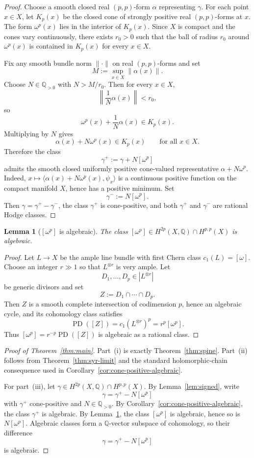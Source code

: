 \documentclass[11pt]{article}
\numberwithin{equation}{section}
\theoremstyle{plain}
\newtheorem{lemma}[theorem]{Lemma}
\theoremstyle{definition}
\theoremstyle{remark}
\DeclareMathOperator{\PD}{PD}
\newcommand{\Q}{\mathbb{Q}}
\begin{document}
\begin{proof}
Choose a smooth closed real $(p,p)$-form $\alpha$ representing $\gamma$. For each point $x\in X$, let $K_p(x)$ be the closed cone of strongly positive real $(p,p)$-forms at $x$. The form $\omega^p(x)$ lies in the interior of $K_p(x)$. Since $X$ is compact and the cones vary continuously, there exists $r_0>0$ such that the ball of radius $r_0$ around $\omega^p(x)$ is contained in $K_p(x)$ for every $x\in X$.

Fix any smooth bundle norm $\|\cdot\|$ on real $(p,p)$-forms and set
\[
M:=\sup_{x\in X}\|\alpha(x)\|.
\]
Choose $N\in\Q_{>0}$ with $N>M/r_0$. Then for every $x\in X$,
\[
\left\|\frac{1}{N}\alpha(x)\right\|<r_0,
\]
so
\[
\omega^p(x)+\frac{1}{N}\alpha(x)\in K_p(x).
\]
Multiplying by $N$ gives
\[
\alpha(x)+N\omega^p(x)\in K_p(x)
\qquad\text{for all }x\in X.
\]
Therefore the class
\[
\gamma^+:=\gamma+N[\omega^p]
\]
admits the smooth closed uniformly positive cone-valued representative $\alpha+N\omega^p$.  Indeed, $x\mapsto\langle \alpha(x)+N\omega^p(x),\psi_x\rangle$ is a continuous positive function on the compact manifold $X$, hence has a positive minimum.  Set
\[
\gamma^-:=N[\omega^p].
\]
Then $\gamma=\gamma^+-\gamma^-$, the class $\gamma^+$ is cone-positive, and both $\gamma^+$ and $\gamma^-$ are rational Hodge classes.
\end{proof}

\begin{lemma}[{$[\omega^p]$ is algebraic}]\label{lem:omega-alg}
The class $[\omega^p]\in H^{2p}(X,\Q)\cap H^{p,p}(X)$ is algebraic.
\end{lemma}

\begin{proof}
Let $L\to X$ be the ample line bundle with first Chern class $c_1(L)=[\omega]$. Choose an integer $r\gg 1$ so that $L^{\otimes r}$ is very ample. Let
\[
D_1,\dots,D_p\in |L^{\otimes r}|
\]
be generic divisors and set
\[
Z:=D_1\cap\cdots\cap D_p.
\]
Then $Z$ is a smooth complete intersection of codimension $p$, hence an algebraic cycle, and its cohomology class satisfies
\[
\PD([Z])=c_1(L^{\otimes r})^p=r^p[\omega^p].
\]
Thus $[\omega^p]=r^{-p}\PD([Z])$ is algebraic as a rational class.
\end{proof}

\begin{proof}[Proof of Theorem~\ref{thm:main}]
Part~\textnormal{(i)} is exactly Theorem~\ref{thm:spine}. Part~\textnormal{(ii)} follows from Theorem~\ref{thm:syr-limit} and the standard holomorphic-chain consequence used in Corollary~\ref{cor:cone-positive-algebraic}.

For part~\textnormal{(iii)}, let $\gamma\in H^{2p}(X,\Q)\cap H^{p,p}(X)$. By Lemma~\ref{lem:signed}, write
\[
\gamma=\gamma^+-N[\omega^p]
\]
with $\gamma^+$ cone-positive and $N\in\Q_{>0}$. By Corollary~\ref{cor:cone-positive-algebraic}, the class $\gamma^+$ is algebraic. By Lemma~\ref{lem:omega-alg}, the class $[\omega^p]$ is algebraic, hence so is $N[\omega^p]$. Algebraic classes form a $\Q$-vector subspace of cohomology, so their difference
\[
\gamma=\gamma^+-N[\omega^p]
\]
is algebraic.
\end{proof}
\end{document}
